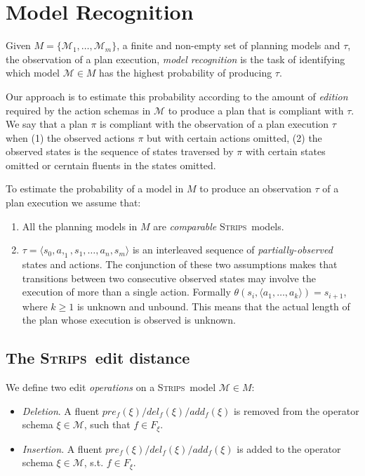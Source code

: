 \documentclass[letterpaper]{article} %
\newcommand{\tup}[1]{{\langle #1 \rangle}}
\newcommand{\strips}{\textsc{Strips}}     %
\begin{document}
\section{Model Recognition}
\label{sec:recognition}
Given $M=\{\mathcal{M}_1,\ldots,\mathcal{M}_m\}$, a finite and non-empty set of planning models and $\tau$, the observation of a plan execution, {\em model recognition} is the task of identifying which model $\mathcal{M}\in M$ has the highest probability of producing $\tau$.

Our approach is to estimate this probability according to the amount of {\em edition} required by the action schemas in $\mathcal{M}$ to produce a plan that is compliant with $\tau$. We say that a plan $\pi$ is compliant with the observation of a plan execution $\tau$ when (1) the observed actions $\pi$ but with certain actions omitted, (2) the observed states is the sequence of states traversed by $\pi$ with certain states omitted or cerntain fluents in the states omitted.

To estimate the probability of a model in $M$ to produce an observation $\tau$ of a plan execution we assume that:
\begin{enumerate}
\item All the planning models in $M$ are {\em comparable} \strips\ models.
\item $\tau=\tup{s_0,a,_1,s_1,\ldots,a_n,s_{m}}$ is an interleaved sequence of {\em partially-observed} states and actions. The conjunction of these two assumptions makes that transitions between two consecutive observed states may involve the execution of more than a single action. Formally $\theta(s_i,\tup{a_1,\ldots,a_k})=s_{i+1}$, where $k\geq 1$ is unknown and unbound. This means that the actual length of the plan whose execution is observed is unknown. 
\end{enumerate}


\subsection{The \strips\ edit distance}
We define two edit \emph{operations} on a \strips\ model $\mathcal{M}\in M$:
\begin{itemize}
\item {\em Deletion}. A fluent $pre_f(\xi)/del_f(\xi)/add_f(\xi)$ is removed from the operator schema $\xi\in\mathcal{M}$, such that $f\in F_{\xi}$.
\item {\em Insertion}. A fluent $pre_f(\xi)/del_f(\xi)/add_f(\xi)$ is added to the operator schema $\xi\in\mathcal{M}$, s.t. $f\in F_{\xi}$.
\end{itemize}
\end{document}
